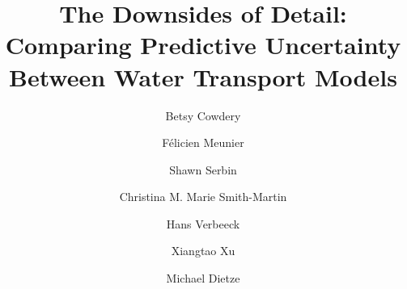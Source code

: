 \documentclass[10pt]{article}
\begin{document}

\title{\vspace{-2.2cm}\textbf{The Downsides of Detail:}\\
\large{\textbf{Comparing Predictive Uncertainty Between Water Transport Models}}}
    
\author[1]{Betsy Cowdery}
\author[2]{F\'{e}licien Meunier}
\author[3]{Shawn Serbin}
\author[4]{Christina M. Marie Smith-Martin}
\author[2]{Hans Verbeeck}
\author[5]{Xiangtao Xu}
\author[1]{Michael Dietze}


\date{\vspace{-2.1cm}}

\maketitle

\tableofcontents
\listoffigures

\newpage










\newpage


\end{document}
